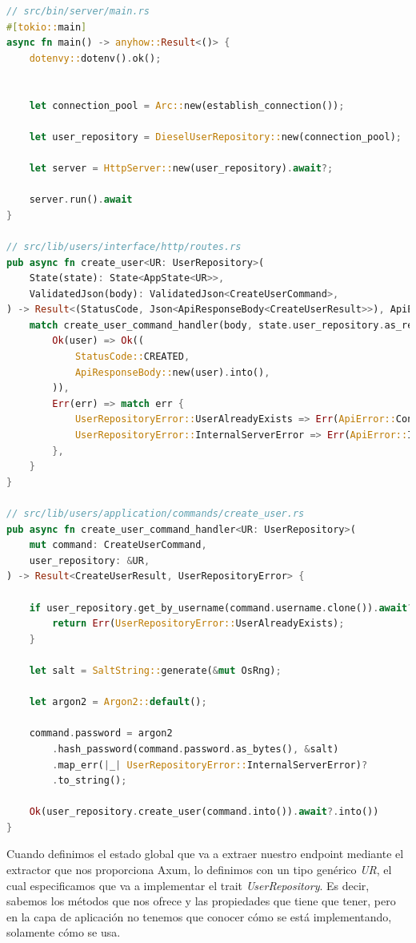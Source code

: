 \begin{lstlisting}[language=Rust, caption={Inyección del repositorio en el estado global y uso en el comando para crear un usuario}, label={lst:inject-repository}]
// src/bin/server/main.rs
#[tokio::main]
async fn main() -> anyhow::Result<()> {
    dotenvy::dotenv().ok();


    let connection_pool = Arc::new(establish_connection());

    let user_repository = DieselUserRepository::new(connection_pool);

    let server = HttpServer::new(user_repository).await?;

    server.run().await
}

// src/lib/users/interface/http/routes.rs
pub async fn create_user<UR: UserRepository>(
    State(state): State<AppState<UR>>,
    ValidatedJson(body): ValidatedJson<CreateUserCommand>,
) -> Result<(StatusCode, Json<ApiResponseBody<CreateUserResult>>), ApiError> {
    match create_user_command_handler(body, state.user_repository.as_ref()).await {
        Ok(user) => Ok((
            StatusCode::CREATED,
            ApiResponseBody::new(user).into(),
        )),
        Err(err) => match err {
            UserRepositoryError::UserAlreadyExists => Err(ApiError::ConflictError(err.to_string())),
            UserRepositoryError::InternalServerError => Err(ApiError::InternalServerError(err.to_string())),
        },
    }
}

// src/lib/users/application/commands/create_user.rs
pub async fn create_user_command_handler<UR: UserRepository>(
    mut command: CreateUserCommand,
    user_repository: &UR,
) -> Result<CreateUserResult, UserRepositoryError> {

    if user_repository.get_by_username(command.username.clone()).await?.is_some() {
        return Err(UserRepositoryError::UserAlreadyExists);
    }

    let salt = SaltString::generate(&mut OsRng);

    let argon2 = Argon2::default();

    command.password = argon2
        .hash_password(command.password.as_bytes(), &salt)
        .map_err(|_| UserRepositoryError::InternalServerError)?
        .to_string();

    Ok(user_repository.create_user(command.into()).await?.into())
}
\end{lstlisting}

Cuando definimos el estado global que va a extraer nuestro endpoint mediante el extractor que nos proporciona Axum, lo definimos con un tipo genérico \textit{UR}, el cual especificamos que va a implementar el trait \textit{UserRepository}. Es decir, sabemos los métodos que nos ofrece y las propiedades que tiene que tener, pero en la capa de aplicación no tenemos que conocer cómo se está implementando, solamente cómo se usa.


